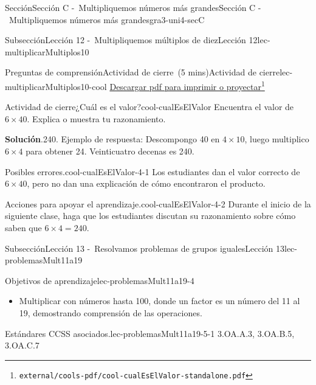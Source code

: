 \documentclass[oneside,10pt,]{article}
\newcommand{\blocktitlefont}{\relax}
\begin{document}
\begin{sectionptx}{Sección}{Sección C -~Multipliquemos números más grandes}{}{Sección C -~Multipliquemos números más grandes}{}{}{gra3-uni4-secC}
\begin{subsectionptx}{Subsección}{Lección 12 -~Multipliquemos múltiplos de diez}{}{Lección 12}{}{}{lec-multiplicarMultiplos10}
\begin{reading-questions-subsubsection}{Preguntas de comprensión}{Actividad de cierre~(5 mins)}{}{Actividad de cierre}{}{}{lec-multiplicarMultiplos10-cool}
\href{external/cools-pdf/cool-cualEsElValor-standalone.pdf}{Descargar pdf para imprimir o proyectar}\footnote{\nolinkurl{external/cools-pdf/cool-cualEsElValor-standalone.pdf}\label{lec-multiplicarMultiplos10-cool-5}}\begin{project}{Actividad de cierre}{¿Cuál es el valor?}{cool-cualEsElValor}%
Encuentra el valor de \(6\times 40\). Explica o muestra tu razonamiento.%
\par\smallskip%
\noindent\textbf{\blocktitlefont Solución}.\hypertarget{cool-cualEsElValor-3}{}\quad{}240. Ejemplo de respuesta: Descompongo 40 en \(4 \times 10\), luego multiplico \(6 \times 4\) para obtener 24. Veinticuatro decenas es 240.%
\end{project}%
\par
\begin{paragraphs}{Posibles errores.}{cool-cualEsElValor-4-1}%
Los estudiantes dan el valor correcto de \(6 \times 40\), pero no dan una explicación de cómo encontraron el producto.%
\end{paragraphs}%
\begin{paragraphs}{Acciones para apoyar el aprendizaje.}{cool-cualEsElValor-4-2}%
Durante el inicio de la siguiente clase, haga que los estudiantes discutan  su razonamiento sobre cómo saben que \(6\times 4 = 240\).%
\end{paragraphs}%
\end{reading-questions-subsubsection}
\end{subsectionptx}
%
%
\typeout{************************************************}
\typeout{************************************************}
%
\begin{subsectionptx}{Subsección}{Lección 13 -~Resolvamos problemas de grupos iguales}{}{Lección 13}{}{}{lec-problemasMult11a19}
\begin{objectives}{Objetivos de aprendizaje}{lec-problemasMult11a19-4}
%
\begin{itemize}[label=\textbullet]
\item{}Multiplicar con números hasta 100, donde un factor es un número del 11 al 19, demostrando comprensión de las operaciones.%
\end{itemize}
\end{objectives}
\begin{introduction}{}%
\begin{paragraphs}{Estándares CCSS asociados.}{lec-problemasMult11a19-5-1}%
3.OA.A.3, 3.OA.B.5, 3.OA.C.7%
\end{paragraphs}%

\end{introduction}
\end{subsectionptx}
\end{sectionptx}
\end{document}
